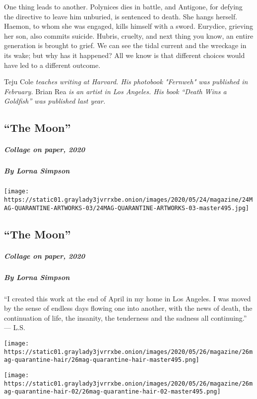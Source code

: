 One thing leads to another. Polynices dies in battle, and Antigone, for
defying the directive to leave him unburied, is sentenced to death. She
hangs herself. Haemon, to whom she was engaged, kills himself with a
sword. Eurydice, grieving her son, also commits suicide. Hubris,
cruelty, and next thing you know, an entire generation is brought to
grief. We can see the tidal current and the wreckage in its wake; but
why has it happened? All we know is that different choices would have
led to a different outcome.

Teju Cole \emph{teaches writing at Harvard. His photobook "Fernweh" was
published in February.} Brian Rea \emph{is an artist in Los Angeles. His
book ``Death Wins a Goldfish'' was published last year.}

\hypertarget{the-moon-2}{%
\subsection{``The Moon''}\label{the-moon-2}}

\hypertarget{collage-on-paper-2020-2}{%
\subparagraph{Collage on paper, 2020}\label{collage-on-paper-2020-2}}

\hypertarget{by-lorna-simpson-2}{%
\subparagraph{By Lorna Simpson}\label{by-lorna-simpson-2}}

\texttt{[image: https://static01.graylady3jvrrxbe.onion/images/2020/05/24/magazine/24MAG-QUARANTINE-ARTWORKS-03/24MAG-QUARANTINE-ARTWORKS-03-master495.jpg]}

\hypertarget{the-moon-3}{%
\subsection{``The Moon''}\label{the-moon-3}}

\hypertarget{collage-on-paper-2020-3}{%
\subparagraph{Collage on paper, 2020}\label{collage-on-paper-2020-3}}

\hypertarget{by-lorna-simpson-3}{%
\subparagraph{By Lorna Simpson}\label{by-lorna-simpson-3}}

``I created this work at the end of April in my home in Los Angeles. I
was moved by the sense of endless days flowing one into another, with
the news of death, the continuation of life, the insanity, the
tenderness and the sadness all continuing.'' --- L.S.

\texttt{[image: https://static01.graylady3jvrrxbe.onion/images/2020/05/26/magazine/26mag-quarantine-hair/26mag-quarantine-hair-master495.png]}

\texttt{[image: https://static01.graylady3jvrrxbe.onion/images/2020/05/26/magazine/26mag-quarantine-hair-02/26mag-quarantine-hair-02-master495.png]}

